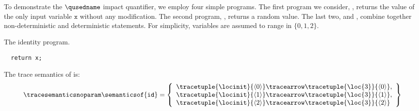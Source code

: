 \begin{example}
  To demonstrate the $\qusedname$ impact quantifier, we employ four simple programs.
  The first program we consider, , returns the value of the only input variable $\texttt{x}$ without any modification.
  The second program, , returns a random value.
  The last two,  and , combine together non-deterministic and deterministic statements.
  For simplicity, variables are assumed to range in $\{0, 1, 2\}$.

  \begin{marginlisting}[*-2]
    \caption{The identity program.}
    \vspace{15pt}
  \begin{lstlisting}[style=mystyle,language=customPython, escapechar=\%]
%\textcolor{black}{id}%(x):
  return x;
 \end{lstlisting}
  \end{marginlisting}
  The trace semantics of  is:
  \begin{align*}
    \tracesemanticsnoparam\semanticsof{\texttt{id}}
    =
    \left\{
      \begin{array}{l}
        \tracetuple{\locinit}{\langle 0\rangle}\tracearrow\tracetuple{\loc{3}}{\langle 0\rangle},\\
        \tracetuple{\locinit}{\langle 1\rangle}\tracearrow\tracetuple{\loc{3}}{\langle 1\rangle},\\
        \tracetuple{\locinit}{\langle 2\rangle}\tracearrow\tracetuple{\loc{3}}{\langle 2\rangle}
      \end{array}
    \right\}
  \end{align*}
  \begin{marginfigure}[*-4]
\end{marginfigure}
\end{example}

